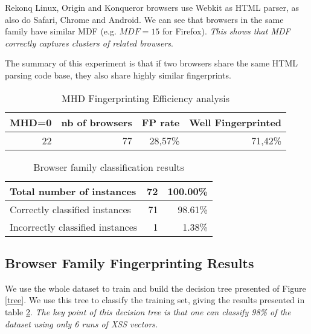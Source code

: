 \documentclass[10pt]{IEEEtran}
\begin{document}
Rekonq Linux, Origin  and Konqueror browsers use Webkit as HTML parser, 
as also do Safari, 
Chrome and Android.
We can see that browsers in the same family have similar MDF (e.g. $MDF=15$ for Firefox).
\emph{This shows that MDF correctly captures clusters of related browsers}.  




The summary of this experiment is that if two browsers share the same HTML parsing code base, they 
also share highly similar fingerprints.
    
\begin{table}
  \centering
  \caption{MHD Fingerprinting Efficiency analysis}
    \begin{tabular}{r|r|r|r}
    \hline
    MHD=0 & nb of browsers & FP rate & Well Fingerprinted \\
    \hline
    22    & 77    & 28,57\% & 71,42\% \\
    \hline
    \end{tabular}
  \label{tab:mhdefficiency}
\end{table}
\begin{table}\center
\caption{Browser family classification results\label{results}}
\begin{tabular}{p{5.8cm}|r|r}
\hline
Total number of instances & 72 & 100.00\% \\
\hline
Correctly classified instances & 71 & 98.61\%  \\
\hline
Incorrectly classified instances & 1 & 1.38\%  \\
\hline
\end{tabular}
\end{table}


\subsection{Browser Family Fingerprinting Results}


\begin{figure*}
\caption{Executing only 6 XSS vectors enables us to classify the browser family with 98\% precision.}
\label{tree}
\end{figure*}
We use the whole dataset to train and build the decision tree presented of Figure \ref{tree}. We use this
tree to classify the training set, giving the results presented in table \ref{results}. 
\emph{The key point of this decision tree is that one can classify 98\% of the dataset using 
only 6 runs of XSS vectors.}
\end{document}
